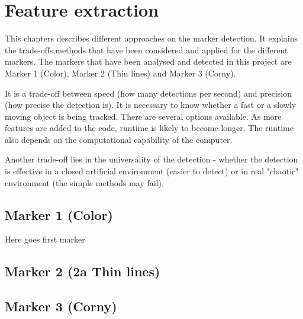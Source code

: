 \chapter{Feature extraction} %
\label{chap:feature_extraction}
This chapters describes different approaches on the marker detection. It explains the trade-offs,methods that have been considered and applied for the different markers. The markers that have been analysed and detected in this project are Marker 1 (Color), Marker 2 (Thin lines) and Marker 3 (Corny). 

It is a trade-off between speed (how many detections per second) and precision (how precise the detection is). It is necessary to know whether a fast or a slowly moving object is being tracked. There are several options available. As more features are added to the code, runtime is likely to become longer. The runtime also depends on the computational capability of the computer.

Another trade-off lies in the universality of the detection - whether the detection is effective in a closed artificial environment (easier to detect) or in real "chaotic" environment (the simple methods may fail).

\newpage
\section{Marker 1 (Color)} 
Here goes first marker

\newpage
\section{Marker 2 (2a Thin lines)}

\newpage
\section{Marker 3 (Corny)}
